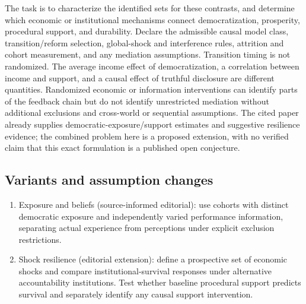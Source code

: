 \documentclass[11pt,a4paper]{article}
\begin{document}
The task is to characterize the identified sets for these contrasts, and determine which economic or institutional mechanisms connect democratization, prosperity, procedural support, and durability. Declare the admissible causal model class, transition/reform selection, global-shock and interference rules, attrition and cohort measurement, and any mediation assumptions. Transition timing is not randomized. The average income effect of democratization, a correlation between income and support, and a causal effect of truthful disclosure are different quantities. Randomized economic or information interventions can identify parts of the feedback chain but do not identify unrestricted mediation without additional exclusions and cross-world or sequential assumptions. The cited paper already supplies democratic-exposure/support estimates and suggestive resilience evidence; the combined problem here is a proposed extension, with no verified claim that this exact formulation is a published open conjecture.
\subsection*{Variants and assumption changes}
\begin{enumerate}
\item Exposure and beliefs (source-informed editorial): use cohorts with distinct democratic exposure and independently varied performance information, separating actual experience from perceptions under explicit exclusion restrictions.
\item Shock resilience (editorial extension): define a prospective set of economic shocks and compare institutional-survival responses under alternative accountability institutions. Test whether baseline procedural support predicts survival and separately identify any causal support intervention.
\end{enumerate}
\end{document}

